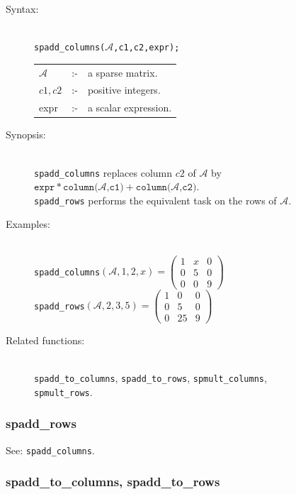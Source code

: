 \begin{description}
\item[Syntax:]\mbox{}\\
{\tt spadd\_columns($\mathcal{A}$,c1,c2,expr);}

\begin{tabular}{l l l}
$\mathcal{A}$ & :- & a sparse matrix. \\
$c1,c2$      & :- & positive integers. \\
expr       & :- & a scalar expression.
\end{tabular}

\item[Synopsis:]\mbox{}\\
\texttt{spadd\_columns} replaces column $c2$ of $\mathcal{A}$ by\\
$\texttt{expr} * \texttt{column($\mathcal{A}$,c1)} + \texttt{column($\mathcal{A}$,c2)}$.\\
\texttt{spadd\_rows} performs the equivalent task on the rows of $\mathcal{A}$.

\item[Examples:]\mbox{}\\
\texttt{spadd\_columns}\((\mathcal{A},1,2,x)  =
  \begin{pmatrix} 1 & x & 0 \\ 0 & 5 & 0 \\ 0 & 0 & 9 \end{pmatrix}\) \\[2mm]
\texttt{spadd\_rows}\((\mathcal{A},2,3,5)  =
\begin{pmatrix} 1 & 0 & 0 \\ 0 & 5 & 0 \\ 0 & 25 & 9 \end{pmatrix}\)

\item[Related functions:]\mbox{}\\
\texttt{spadd\_to\_columns}, \texttt{spadd\_to\_rows},
\texttt{spmult\_columns},\\ \texttt{spmult\_rows}.
\end{description}

\subsubsection{spadd\_rows}
\label{sparse:spadd_rows}
\hypertarget{operator:SPADD_ROWS}{}

See: \texttt{spadd\_columns}.


\subsubsection{spadd\_to\_columns, spadd\_to\_rows}
\label{sparse:spadd_to_columns}
\hypertarget{operator:SPADD_TO_COLUMNS}{}

